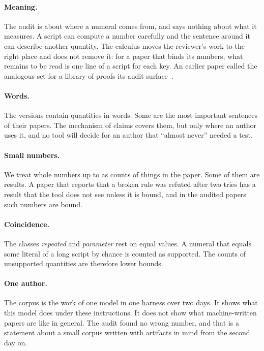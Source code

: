 \documentclass[acmsmall,nonacm,screen]{acmart}
\begin{document}
\paragraph{Meaning.} The audit is about where a numeral comes from, and says nothing about
what it measures. A script can compute a number carefully and the sentence around it can
describe another quantity. The calculus moves the reviewer's work to the right place and
does not remove it: for a paper that binds its numbers, what remains to be read is one line
of a script for each key. An earlier paper called the analogous set for a library of proofs
its audit surface~\citep{tpp1}.

\paragraph{Words.} The versions contain \exAllWords{} quantities in words. Some are the most
important sentences of their papers. The mechanism of claims covers them, but only where an
author uses it, and no tool will decide for an author that ``almost never'' needed a test.

\paragraph{Small numbers.} We treat whole numbers up to \exSmallLimit{} as counts of things
in the paper. Some of them are results. A paper that reports that a broken rule was refuted
after two tries has a result that the tool does not see unless it is bound, and in the
audited papers such numbers are bound.

\paragraph{Coincidence.} The classes \emph{repeated} and \emph{parameter} rest on equal
values. A numeral that equals some literal of a long script by chance is counted as
supported. The counts of unsupported quantities are therefore lower bounds.

\paragraph{One author.} The corpus is the work of one model in one harness over two days.
It shows what this model does under these instructions. It does not show what machine-written
papers are like in general. The audit found no wrong number, and that is a statement about a
small corpus written with artifacts in mind from the second day on.
\end{document}
